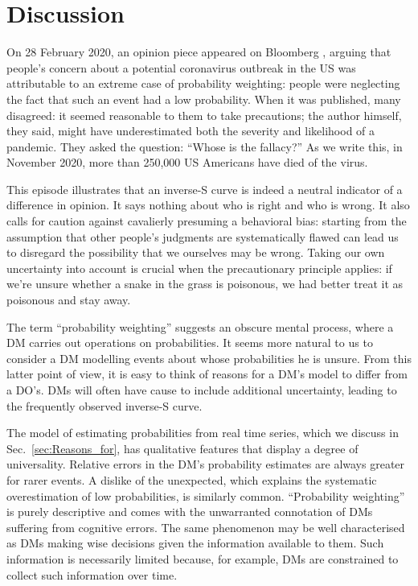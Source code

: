 \documentclass[a4paper, 12pt]{article}
\newcommand{\secref}[1]{Sec.~\ref{sec:#1}}
\begin{document}
\section{Discussion}

On 28 February 2020, an opinion piece appeared on Bloomberg \textcite{Sunstein2020}, arguing that
people's concern about a potential coronavirus outbreak in the US was attributable to an extreme case of probability weighting: people were neglecting the fact that such an event had a low probability. When it was published, many disagreed: it seemed reasonable to them to take precautions; the author himself, they said, might have underestimated both the severity and likelihood of a pandemic. They asked the \textcite{Cohen1979a} question: ``Whose is the fallacy?''
As we write this, in November 2020, more than 250,000 US Americans have died of the virus.

This episode illustrates that an inverse-S curve is indeed a neutral indicator of a difference in opinion. 
It says nothing about who is right and who is wrong. 
It also calls for caution against cavalierly presuming a behavioral bias: starting from the assumption that other people's judgments are systematically flawed can lead us to disregard the possibility that we ourselves may be wrong. Taking our own uncertainty into account is crucial when the precautionary principle applies: if we're unsure whether a snake in the grass is poisonous, we had better treat it as poisonous and stay away.

The term ``probability weighting'' suggests an obscure mental process, where a DM carries out operations on probabilities. It seems more natural to us to consider a DM modelling events about whose probabilities he is unsure. From this latter point of view, it is easy to think of reasons for a DM's model to differ from a DO's. DMs will often have cause to include additional uncertainty, leading to the frequently observed inverse-S curve.

The model of estimating probabilities from real time series, which we discuss in \secref{Reasons_for}, has qualitative features that display a degree of universality. Relative errors in the DM's probability estimates are always greater for rarer events. A dislike of the unexpected, which explains the systematic overestimation of low probabilities, is similarly common. ``Probability weighting'' is purely descriptive and comes with the unwarranted connotation of DMs suffering from cognitive errors. The same phenomenon may be well characterised as DMs making wise decisions given the information available to them. Such information is necessarily limited because, for example, DMs are constrained to collect such information over time.
\end{document}
